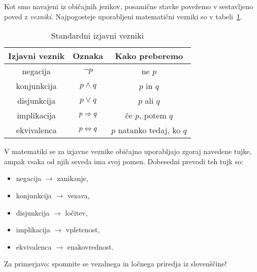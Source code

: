                 Kot smo navajeni iz običajnih jezikov, posamične stavke povežemo v sestavljeno poved z \emph{vezniki}. Najpogosteje uporabljeni matematični vezniki so v tabeli~\ref{tabela:standardni-izjavni-vezniki}.

                \begin{table}[!ht]
                        \centering
                        \begin{tabular}{|ccc|}
                                \hline
                                \textbf{Izjavni veznik} & \textbf{Oznaka} & \textbf{Kako preberemo} \\
                                \hline
                                negacija & $\lnot{p}$ & ne $p$ \\
                                konjunkcija & $p \land q$ & $p$ in $q$ \\
                                disjunkcija & $p \lor q$ & $p$ ali $q$ \\
                                implikacija & $p \Rightarrow q$ & če $p$, potem $q$ \\
                                ekvivalenca & $p \Leftrightarrow q$ & $p$ natanko tedaj, ko $q$ \\
                                \hline
                        \end{tabular}
                        \caption{Standardni izjavni vezniki}\label{tabela:standardni-izjavni-vezniki}
                \end{table}

                \begin{opomba}
                        V matematiki se za izjavne veznike običajno uporabljajo zgoraj navedene tujke, ampak vsaka od njih seveda ima svoj pomen. Dobesedni prevodi teh tujk so:
                        \begin{itemize}
                                \item
                                        negacija $\to$ zanikanje,
                                \item
                                        konjunkcija $\to$ vezava,
                                \item
                                        disjunkcija $\to$ ločitev,
                                \item
                                        implikacija $\to$ vpletenost,
                                \item
                                        ekvivalenca $\to$ enakovrednost.
                        \end{itemize}
                        Za primerjavo: spomnite se vezalnega in ločnega priredja iz slovenščine!
                \end{opomba}

